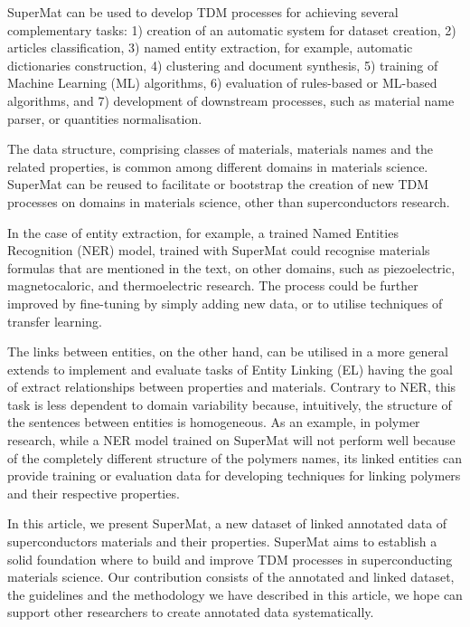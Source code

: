 \documentclass[fleqn,10pt]{wlscirep}
\begin{document}
SuperMat can be used to develop TDM processes for achieving several complementary tasks: 
1) creation of an automatic system for dataset creation, 
2) articles classification, 
3) named entity extraction, for example, automatic dictionaries construction, 
4) clustering and document synthesis,
5) training of Machine Learning (ML) algorithms,
6) evaluation of rules-based or ML-based algorithms, and 
7) development of downstream processes, such as material name parser, or quantities normalisation.


The data structure, comprising classes of materials, materials names and the related properties, is common among different domains in materials science. 
SuperMat can be reused to facilitate or bootstrap the creation of new TDM processes on domains in materials science, other than superconductors research.

In the case of entity extraction, for example, a trained Named Entities Recognition (NER) model, trained with SuperMat could recognise materials formulas that are mentioned in the text, on other domains, such as piezoelectric, magnetocaloric, and thermoelectric research.
The process could be further improved by fine-tuning by simply adding new data, or to utilise techniques of transfer learning. 

The links between entities, on the other hand, can be utilised in a more general extends to implement and evaluate tasks of Entity Linking (EL) having the goal of extract relationships between properties and materials. 
Contrary to NER, this task is less dependent to domain variability because, intuitively, the structure of the sentences between entities is homogeneous.
As an example, in polymer research, while a NER model trained on SuperMat will not perform well because of the completely different structure of the polymers names, its linked entities can provide training or evaluation data for developing techniques for linking polymers and their respective properties.

In this article, we present SuperMat, a new dataset of linked annotated data of superconductors materials and their properties. SuperMat aims to establish a solid foundation where to build and improve TDM processes in superconducting materials science.
Our contribution consists of the annotated and linked dataset, the guidelines and the methodology we have described in this article, we hope can support other researchers to create annotated data systematically.
\end{document}
